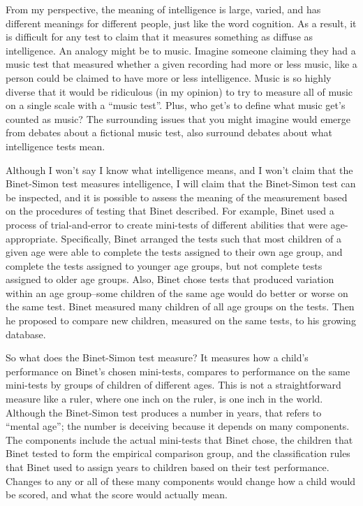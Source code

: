 \documentclass[
  oneside,
  12pt]{crumpbook}
\begin{document}
From my perspective, the meaning of intelligence is large, varied, and has different meanings for different people, just like the word cognition. As a result, it is difficult for any test to claim that it measures something as diffuse as intelligence. An analogy might be to music. Imagine someone claiming they had a music test that measured whether a given recording had more or less music, like a person could be claimed to have more or less intelligence. Music is so highly diverse that it would be ridiculous (in my opinion) to try to measure all of music on a single scale with a ``music test''. Plus, who get's to define what music get's counted as music? The surrounding issues that you might imagine would emerge from debates about a fictional music test, also surround debates about what intelligence tests mean.

Although I won't say I know what intelligence means, and I won't claim that the Binet-Simon test measures intelligence, I will claim that the Binet-Simon test can be inspected, and it is possible to assess the meaning of the measurement based on the procedures of testing that Binet described. For example, Binet used a process of trial-and-error to create mini-tests of different abilities that were age-appropriate. Specifically, Binet arranged the tests such that most children of a given age were able to complete the tests assigned to their own age group, and complete the tests assigned to younger age groups, but not complete tests assigned to older age groups. Also, Binet chose tests that produced variation within an age group--some children of the same age would do better or worse on the same test. Binet measured many children of all age groups on the tests. Then he proposed to compare new children, measured on the same tests, to his growing database.

So what does the Binet-Simon test measure? It measures how a child's performance on Binet's chosen mini-tests, compares to performance on the same mini-tests by groups of children of different ages. This is not a straightforward measure like a ruler, where one inch on the ruler, is one inch in the world. Although the Binet-Simon test produces a number in years, that refers to ``mental age''; the number is deceiving because it depends on many components. The components include the actual mini-tests that Binet chose, the children that Binet tested to form the empirical comparison group, and the classification rules that Binet used to assign years to children based on their test performance. Changes to any or all of these many components would change how a child would be scored, and what the score would actually mean.
\end{document}
